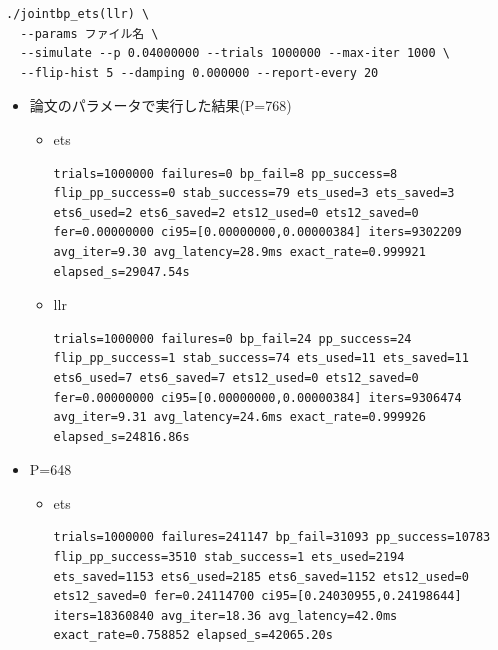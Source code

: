 \documentclass[a4paper,11pt,dvipdfmx]{jsarticle}
\theoremstyle{definition}
\begin{document}
\begin{verbatim}
./jointbp_ets(llr) \
  --params ファイル名 \
  --simulate --p 0.04000000 --trials 1000000 --max-iter 1000 \
  --flip-hist 5 --damping 0.000000 --report-every 20
\end{verbatim}
\begin{itemize}
    \item 論文のパラメータで実行した結果(P=768)
    \begin{itemize}
        \item ets
        \begin{lstlisting}[breaklines=true, basicstyle=\ttfamily\small, frame=single, xleftmargin=2em]
trials=1000000 failures=0 bp_fail=8 pp_success=8 flip_pp_success=0 stab_success=79 ets_used=3 ets_saved=3 ets6_used=2 ets6_saved=2 ets12_used=0 ets12_saved=0 fer=0.00000000 ci95=[0.00000000,0.00000384] iters=9302209 avg_iter=9.30 avg_latency=28.9ms exact_rate=0.999921 elapsed_s=29047.54s
        \end{lstlisting}
        
        \item llr
        \begin{lstlisting}[breaklines=true, basicstyle=\ttfamily\small, frame=single, xleftmargin=2em]
trials=1000000 failures=0 bp_fail=24 pp_success=24 flip_pp_success=1 stab_success=74 ets_used=11 ets_saved=11 ets6_used=7 ets6_saved=7 ets12_used=0 ets12_saved=0 fer=0.00000000 ci95=[0.00000000,0.00000384] iters=9306474 avg_iter=9.31 avg_latency=24.6ms exact_rate=0.999926 elapsed_s=24816.86s
        \end{lstlisting}
    \end{itemize}
    \item P=648
    \begin{itemize}
        \item ets
        \begin{lstlisting}[breaklines=true, basicstyle=\ttfamily\small, frame=single, xleftmargin=2em]
trials=1000000 failures=241147 bp_fail=31093 pp_success=10783 flip_pp_success=3510 stab_success=1 ets_used=2194 ets_saved=1153 ets6_used=2185 ets6_saved=1152 ets12_used=0 ets12_saved=0 fer=0.24114700 ci95=[0.24030955,0.24198644] iters=18360840 avg_iter=18.36 avg_latency=42.0ms exact_rate=0.758852 elapsed_s=42065.20s
        \end{lstlisting}
        

\end{itemize}
\end{itemize}
\end{document}

